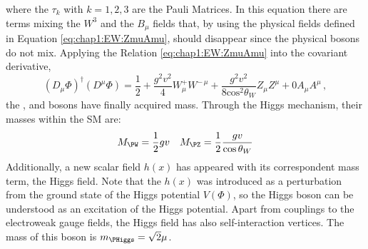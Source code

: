 where the $\tau_k$ with $k={1,2,3}$ are the Pauli Matrices. In this equation there are terms mixing the $W^{3}$ and the $B_{\mu}$ fields that, by using the physical fields defined in Equation \ref{eq:chap1:EW:ZmuAmu}, should disappear since the physical bosons do not mix. Applying the Relation \ref{eq:chap1:EW:ZmuAmu} into the covariant derivative, 
\begin{equation*}
	(D_{\mu} \Phi)^{\dagger}(D^{\mu} \Phi) = \frac{1}{2}+\frac{g^2v^2}{4}W^{+}_{\mu} W^{-\, \mu} + \frac{g^{2} v^{2}}{8 \textrm{cos}^{2}\theta_{W}}Z_{\mu}Z^{\mu} + 0 A_{\mu}A^{\mu}\, ,
\end{equation*}
the \PWplus, \PWminus and \PZ bosons have finally acquired mass. Through the Higgs mechanism, their masses within the SM are:
\begin{align*}
	M_{\PW} = \frac{1}{2}gv && M_{\PZ} = \frac{1}{2}\frac{gv}{\textrm{cos}\,\theta_{W}}
\end{align*}
Additionally, a new scalar field $h(x)$ has appeared with its correspondent mass term, the Higgs field. Note that the $h(x)$ was introduced as a perturbation from the ground
state of the Higgs potential $V(\Phi)$, so the Higgs boson can be understood as an excitation of the Higgs potential. Apart from couplings to the electroweak gauge
fields, the Higgs field has also self-interaction vertices. The mass of this boson is $m_{\PHiggs}=\sqrt{2}\mu$.

